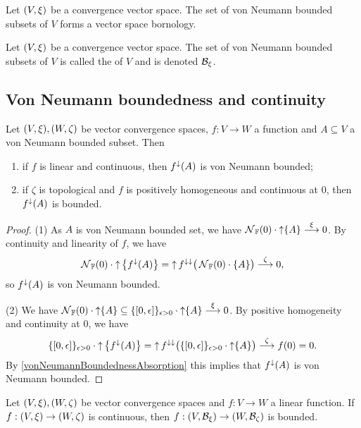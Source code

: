 \begin{corollary}
Let $\sSet{V, \xi}$ be a convergence vector space. The set of von Neumann bounded subsets of $V$ forms a vector space bornology.
\end{corollary}

\begin{definition}
Let $\sSet{V, \xi}$ be a convergence vector space. The set of von Neumann bounded subsets of $V$ is called the  of $V$ and is denoted $\mathcal{B}_{\xi}$.
\end{definition}

\subsection{Von Neumann boundedness and continuity}
\begin{proposition} \label{continuousMappingBoundedSets}
Let $\sSet{V,\xi}, \sSet{W,\zeta}$ be vector convergence spaces, $f:V\to W$ a function and $A\subseteq V$ a von Neumann bounded subset. Then
\begin{enumerate}
\item if $f$ is linear and continuous, then $f^\downarrow(A)$ is von Neumann bounded;
\item if $\zeta$ is topological and $f$ is positively homogeneous and continuous at $0$, then $f^\downarrow(A)$ is bounded.
\end{enumerate} 
\end{proposition}
\begin{proof}
(1) As $A$ is von Neumann bounded set, we have $\operatorname{\mathcal{N}}_{\mathbb{F}}(0) \cdot \operatorname{\uparrow}\{A\} \overset{\xi}{\longrightarrow} 0$. By continuity and linearity of $f$, we have
\[ \operatorname{\mathcal{N}}_{\mathbb{F}}(0) \cdot \operatorname{\uparrow}\big\{f^{\downarrow}(A)\big\} = \operatorname{\uparrow} f^{\downarrow\downarrow}\big(\operatorname{\mathcal{N}}_{\mathbb{F}}(0)\cdot \{A\}\big) \overset{\zeta}{\longrightarrow} 0, \]
so $f^\downarrow(A)$ is von Neumann bounded.

(2) We have $\neighbourhood_\F(0) \cdot \upset\{A\} \subseteq \{\interval{0,\epsilon}\}_{\epsilon >0} \cdot \upset\{A\} \overset{\xi}{\longrightarrow} 0$. By positive homogeneity and continuity at $0$, we have
\[ \{\interval{0,\epsilon}\}_{\epsilon >0} \cdot \upset\big\{f^{\imf}(A)\big\} = \upset f^{\imf\imf}\big(\{\interval{0,\epsilon}\}_{\epsilon >0} \cdot \upset\{A\}\big) \overset{\zeta}{\longrightarrow} f(0) = 0. \]
By \ref{vonNeumannBoundednessAbsorption} this implies that $f^{\downarrow}(A)$ is von Neumann bounded.
\end{proof}
\begin{corollary}
Let $\sSet{V,\xi}, \sSet{W,\zeta}$ be vector convergence spaces and $f:V\to W$ a linear function. If $f: \sSet{V,\xi}\to \sSet{W,\zeta}$ is continuous, then $f: \sSet{V,\vNborn{\xi}}\to \sSet{W,\vNborn{\zeta}}$ is bounded.
\end{corollary}

